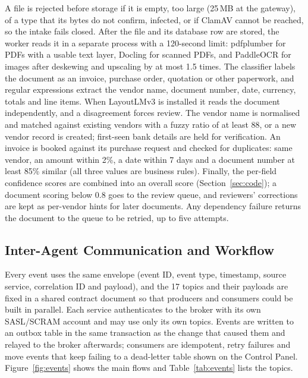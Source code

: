 A file is rejected before storage if it is empty, too large (25\,MB at the gateway), of a type that its bytes do not confirm, infected, or if ClamAV cannot be reached, so the intake fails closed. After the file and its database row are stored, the worker reads it in a separate process with a 120-second limit: pdfplumber for PDFs with a usable text layer, Docling for scanned PDFs, and PaddleOCR for images after deskewing and upscaling by at most 1.5 times. The classifier labels the document as an invoice, purchase order, quotation or other paperwork, and regular expressions extract the vendor name, document number, date, currency, totals and line items. When LayoutLMv3 is installed it reads the document independently, and a disagreement forces review. The vendor name is normalised and matched against existing vendors with a fuzzy ratio of at least 88, or a new vendor record is created; first-seen bank details are held for verification. An invoice is booked against its purchase request and checked for duplicates: same vendor, an amount within 2\%, a date within 7 days and a document number at least 85\% similar (all three values are business rules). Finally, the per-field confidence scores are combined into an overall score (Section~\ref{sec:code}); a document scoring below 0.8 goes to the review queue, and reviewers' corrections are kept as per-vendor hints for later documents. Any dependency failure returns the document to the queue to be retried, up to five attempts.

\subsection{Inter-Agent Communication and Workflow}
Every event uses the same envelope (event ID, event type, timestamp, source service, correlation ID and payload), and the 17 topics and their payloads are fixed in a shared contract document so that producers and consumers could be built in parallel. Each service authenticates to the broker with its own SASL/SCRAM account and may use only its own topics. Events are written to an outbox table in the same transaction as the change that caused them and relayed to the broker afterwards; consumers are idempotent, retry failures and move events that keep failing to a dead-letter table shown on the Control Panel. Figure~\ref{fig:events} shows the main flows and Table~\ref{tab:events} lists the topics.

